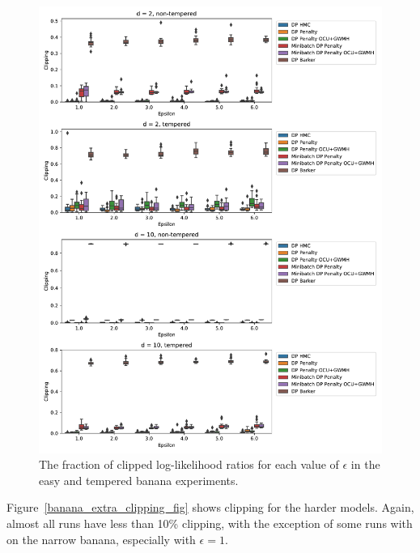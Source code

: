 \documentclass[english,twoside,openright]{HYgraduMLDS}
\begin{document}
\begin{figure}
  \centering
  \includegraphics[width=\textwidth]{figures/banana_clipping.pdf}
  \caption{
    The fraction of clipped log-likelihood ratios for each value of \(\epsilon\) in
    the easy and tempered banana experiments.
  }
  \label{banana_clipping_fig}
\end{figure}

Figure~\ref{banana_extra_clipping_fig} shows clipping for the harder models.
Again, almost all runs have less than 10\% clipping, with the exception of
some runs with on the narrow banana, especially with \(\epsilon = 1\).
\end{document}
